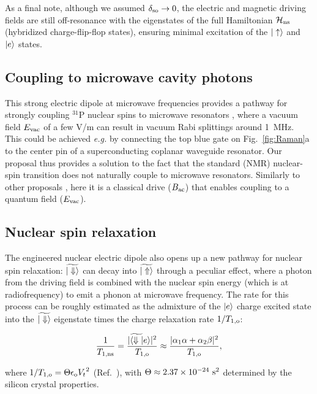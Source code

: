 As a final note, although we assumed $\delta_{\rm so} \rightarrow 0$, the electric and magnetic driving fields are still off-resonance with the eigenstates of the full Hamiltonian $\mathcal{H}_{\rm ns}$ (hybridized charge-flip-flop states), ensuring minimal excitation of the $|\uparrow\rangle$ and $|e\rangle$ states.

\subsection{Coupling to microwave cavity photons}

This strong electric dipole at microwave frequencies provides a pathway for strongly coupling $^{31}$P nuclear spins to microwave resonators \cite{Blais2004}, where a vacuum field $E_{\rm vac}$ of a few V/m can result in vacuum Rabi splittings around 1~MHz. This could be achieved \textit{e.g.} by connecting the top blue gate on Fig.~\ref{fig:Raman}a to the center pin of a superconducting coplanar waveguide resonator. Our proposal thus provides a solution to the fact that the standard (NMR) nuclear-spin transition does not naturally couple to microwave resonators. Similarly to other proposals  \cite{Pachos2002,Childress2004,Feng2008,Abanto2010}, here it is a classical drive ($B_{\rm ac}$) that enables coupling to a quantum field ($E_{\rm vac}$).

\subsection{Nuclear spin relaxation}

The engineered nuclear electric dipole also opens up a new pathway for nuclear spin relaxation: $\widetilde{|\Downarrow\rangle}$ can decay into $\widetilde{|\Uparrow\rangle}$ through a peculiar effect, where a photon from the driving field is combined with the nuclear spin energy (which is at radiofrequency) to emit a phonon at microwave frequency. The rate for this process can be roughly estimated as the admixture of the $|e\rangle$ charge excited state into the $\widetilde{|\Downarrow\rangle}$ eigenstate times the charge relaxation rate ${1}/{T_{1,\rm o}}$:

\begin{equation}\label{eq:T1ff}
\frac{1}{T_{1,\rm ns}}=\frac{|\widetilde{\langle \Downarrow|}e\rangle|^2}{T_{1,\rm o}}\approx \frac{|\alpha_1\alpha+\alpha_2\beta|^2}{{T_{1,\rm o}}},
\end{equation}

where ${1}/{T_{1,\rm o}}=\Theta\epsilon_{\rm o}{V_t}^2$ (Ref.~\cite{Boross2016}), with $\Theta\approx2.37\times10^{-24}~{\rm s}^2$ determined by the silicon crystal properties. 

